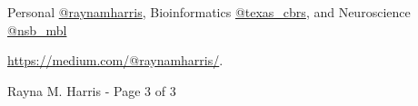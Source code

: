 \documentclass[margin,line]{resume}
\begin{document}
\begin{resume}
\begin{description}{}{
\setlength{\leftmargin}{1cm}%
\setlength{\itemindent}{-1cm}
}
\setlength{\itemsep}{3pt}
\item[Twitter:] Personal \href{http://twitter.com/raynamharris}{@raynamharris}, Bioinformatics \href{http://twitter.com/texas\_cbrs}{@texas\_cbrs}, and Neuroscience \href{http://twitter.com/nsb\_mbl}{@nsb\_mbl} 
\item[Professional/personal blog:] \url{https://medium.com/@raynamharris/}. %

\end{description}







\vspace{0.6 cm}
{\centerline {Rayna M. Harris - Page 3 of 3}}

\end{resume}
\end{document}
